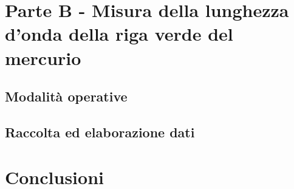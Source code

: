 \documentclass[10pt,a4paper]{article}
\begin{document}
\section{Parte B - Misura della lunghezza d'onda della riga verde del mercurio}
\subsection{Modalità operative}

\subsection{Raccolta ed elaborazione dati}

\section{Conclusioni}
\end{document}
